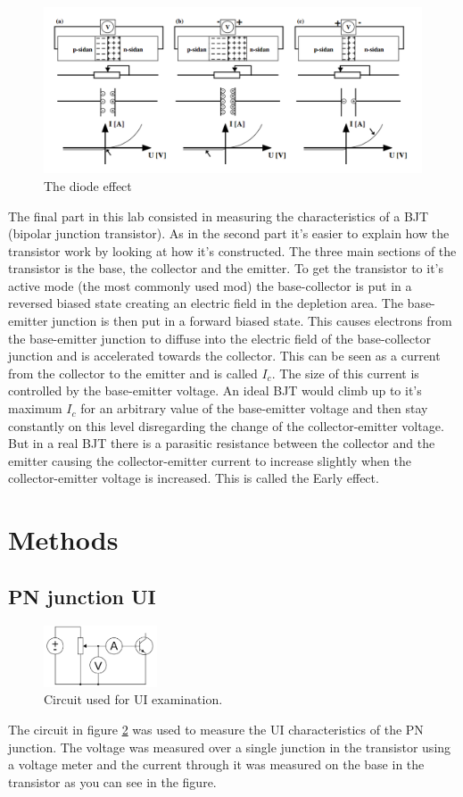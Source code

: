 \documentclass[a4paper]{article}
\begin{document}
\begin{figure}[H]
\centering
\includegraphics[scale=0.3]{diodeeffect.png}
\caption{The diode effect}
\label{diode}
\end{figure}

The final part in this lab consisted in measuring the characteristics of a BJT (bipolar junction transistor). As in the second part it's easier to explain how the transistor work by looking at how it's constructed. The three main sections of the transistor is the base, the collector and the emitter. To get the transistor to it's active mode (the most commonly used mod) the base-collector is put in a reversed biased state creating an electric field in the depletion area. The base-emitter junction is then put in a forward biased state. This causes electrons from the base-emitter junction to diffuse into the electric field of the base-collector junction and is accelerated towards the collector. This can be seen as a current from the collector to the emitter and is called $I_c$. The size of this current is controlled by the base-emitter voltage. An ideal BJT would climb up to it's maximum $I_c$ for an arbitrary value of the base-emitter voltage and then stay constantly on this level disregarding the change of the collector-emitter voltage. But in a real BJT there is a parasitic resistance between the collector and the emitter causing the collector-emitter current to increase slightly when the collector-emitter voltage is increased. This is called the Early effect.

\section{Methods}
\subsection{PN junction UI}
\begin{figure}[H]
	\centering
	\includegraphics[width=0.3\textwidth]{ui_koppling.png}
	\caption{Circuit used for UI examination.}
	\label{ui_koppling}
\end{figure}
The circuit in figure \ref{ui_koppling} was used to measure the UI characteristics of the PN junction. The voltage was measured over a single junction in the transistor using a voltage meter and the current through it was measured on the base in the transistor as you can see in the figure.
\end{document}
